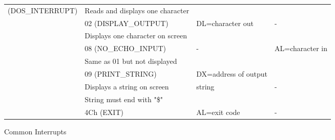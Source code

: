 \begin{figure}[h]
\begin{tabular}{| p{4cm} | p{4.5cm} | p{4cm} | p{3.5cm} |}
(DOS\_INTERRUPT) & Reads and displays one character   &         &           \\
\cline{2-4} 
		                      & 02 (DISPLAY\_OUTPUT)                    & DL=character out       & -       \\                                                                                                                                            				     & Displays one character on screen      &  & \\
\cline{2-4} 
				    & 08 (NO\_ECHO\_INPUT)              & -                             & AL=character in   \\
				    & Same as 01 but not displayed       & &\\       
\cline{2-4}     
			 	   & 09 (PRINT\_STRING)           	   & DX=address of output           &         \\
				   & Displays a string on screen            & string & - \\
				   & String must end with "\$"		   &   &  \\
\cline{2-4}    
		                    & 4Ch (EXIT)                                    & AL=exit code                         & -      \\
\hline                                                                                                                                  
\end{tabular}
\caption{Common Interrupts \label{fig:interrupts}}
\end{figure}
